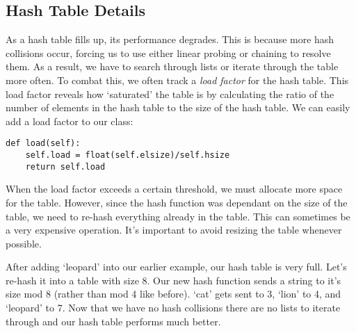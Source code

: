 \subsection*{Hash Table Details}
As a hash table fills up, its performance degrades.
This is because more hash collisions occur, forcing us to use either linear probing or chaining to resolve them.
As a result, we have to search through lists or iterate through the table more often.
To combat this, we often track a \emph{load factor} for the hash table.
This load factor reveals how `saturated' the table is by calculating the ratio of the number of elements in the hash table to the size of the hash table.
We can easily add a load factor to our  class:
\begin{lstlisting}
def load(self):
    self.load = float(self.elsize)/self.hsize
    return self.load
\end{lstlisting}

When the load factor exceeds a certain threshold, we must allocate more space for the table.
However, since the hash function was dependant on the size of the table, we need to re-hash everything already in the table.
This can sometimes be a very expensive operation.
It's important to avoid resizing the table whenever possible.

After adding `leopard' into our earlier example, our hash table is very full. Let's re-hash it into a table with size 8.
Our new hash function sends a string to it's size mod 8 (rather than mod 4 like before).
`cat' gets sent to 3, `lion' to 4, and `leopard' to 7.
Now that we have no hash collisions there are no lists to iterate through and our hash table performs much better.
\begin{center}
\end{center}

